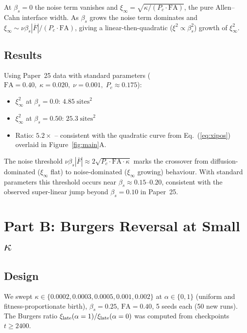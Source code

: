\documentclass[11pt,a4paper]{article}
\begin{document}
At $\beta_s = 0$ the noise term vanishes and $\xi_\infty =
\sqrt{\kappa/(P_c \cdot \mathrm{FA})}$, the pure Allen--Cahn interface width.
As $\beta_s$ grows the noise term dominates and
$\xi_\infty \sim \nu\beta_s|\overline{F}| / (P_c \cdot \mathrm{FA})$,
giving a linear-then-quadratic ($\xi^2 \propto \beta_s^2$) growth of
$\xi_\infty^2$.

\subsection{Results}

Using Paper~25 data with standard parameters
($\mathrm{FA}=0.40,\;\kappa=0.020,\;\nu=0.001,\;P_c \approx 0.175$):
\begin{itemize}
  \item $\xi_\infty^2$ at $\beta_s=0.0$: $4.85\;\mathrm{sites}^2$
  \item $\xi_\infty^2$ at $\beta_s=0.50$: $25.3\;\mathrm{sites}^2$
  \item Ratio: $5.2\times$ -- consistent with the quadratic curve from
        Eq.~(\ref{eq:xipos}) overlaid in Figure~\ref{fig:main}A.
\end{itemize}

The noise threshold $\nu\beta_s|\overline{F}| \approx 2\sqrt{P_c\cdot\mathrm{FA}\cdot\kappa}$
marks the crossover from diffusion-dominated ($\xi_\infty$ flat) to
noise-dominated ($\xi_\infty$ growing) behaviour.  With standard parameters
this threshold occurs near $\beta_s \approx 0.15$--$0.20$, consistent with
the observed super-linear jump beyond $\beta_s = 0.10$ in Paper~25.

\section{Part B: Burgers Reversal at Small $\kappa$}
\label{sec:partB}

\subsection{Design}

We swept $\kappa \in \{0.0002, 0.0003, 0.0005, 0.001, 0.002\}$ at
$\alpha \in \{0, 1\}$ (uniform and fitness-proportionate birth),
$\beta_s = 0.25$, $\mathrm{FA}=0.40$, 5 seeds each (50 new runs).
The Burgers ratio $\xi_{\rm late}(\alpha=1)/\xi_{\rm late}(\alpha=0)$
was computed from checkpoints $t \geq 2400$.
\end{document}

